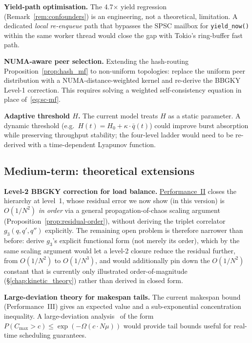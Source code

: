 \documentclass[11pt,a4paper]{article}
\begin{document}
\medskip
\noindent\textbf{Yield-path optimisation.}
The 4.7$\times$ yield regression (Remark~\ref{rem:confounders}) is an
engineering, not a theoretical, limitation.  A dedicated
\emph{local re-enqueue} path that bypasses the SPSC mailbox for
\texttt{yield\_now()} within the same worker thread would close the
gap with Tokio's ring-buffer fast path.

\medskip
\noindent\textbf{NUMA-aware peer selection.}
Extending the hash-routing Proposition~\ref{prop:hash_mf} to
non-uniform topologies: replace the uniform peer distribution with
a NUMA-distance-weighted kernel and re-derive the BBGKY Level-1
correction.  This requires solving a weighted self-consistency equation
in place of~\eqref{eq:sc-mf}.

\medskip
\noindent\textbf{Adaptive threshold $H$.}
The current model treats $H$ as a static parameter.  A dynamic
threshold (e.g.\ $H(t) = H_0 + \kappa \cdot \bar{q}(t)$) could
improve burst absorption while preserving throughput stability;
the four-level ladder would need to be re-derived with a
time-dependent Lyapunov function.

\subsection{Medium-term: theoretical extensions}

\medskip
\noindent\textbf{Level-2 BBGKY correction for load balance.}
\hyperref[chap:kinetic_theory]{Performance~II} closes the hierarchy at
level~1, whose residual error we now show (in this version) is
$O(1/N^2)$ \emph{in order} via a general propagation-of-chaos scaling
argument (Proposition~\ref{prop:residual-order}), without deriving the
triplet correlator $g_3(q,q',q'')$ explicitly. The remaining open
problem is therefore narrower than before: derive $g_3$'s explicit
functional form (not merely its order), which by the same scaling
argument would let a level-2 closure reduce the residual further, from
$O(1/N^2)$ to $O(1/N^3)$, and would additionally pin down the
$O(1/N^2)$ constant that is currently only illustrated
order-of-magnitude (\S\ref{chap:kinetic_theory}) rather than derived
in closed form.

\medskip
\noindent\textbf{Large-deviation theory for makespan tails.}
The current makespan bound (Performance~III) gives an expected value
and a sub-exponential concentration inequality.  A large-deviation
analysis~\cite{gardiner2004} of the form
$P(C_{\max} > c) \leq \exp(-\Omega(c \cdot N \mu))$ would provide
tail bounds useful for real-time scheduling guarantees.
\end{document}
